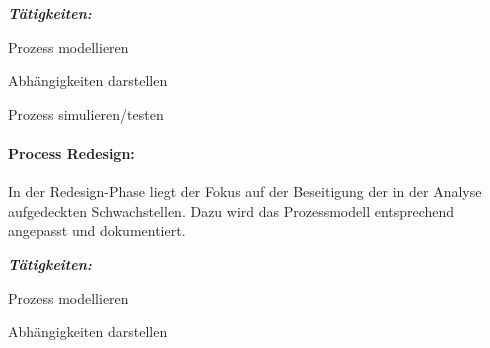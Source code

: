 \medskip\textit{\textbf{Tätigkeiten:}}
\begin{compactitem}{}
\item[] Prozess modellieren
\item[] Abhängigkeiten darstellen
\item[] Prozess simulieren/testen
\end{compactitem}

%
%
%

\newpage
\paragraph*{Process Redesign:}
In der Redesign-Phase liegt der Fokus auf der Beseitigung der in der Analyse aufgedeckten Schwachstellen. Dazu wird das Prozessmodell entsprechend angepasst und dokumentiert. 

\medskip\textit{\textbf{Tätigkeiten:}}
\begin{compactitem}{}
\item[] Prozess modellieren
\item[] Abhängigkeiten darstellen
\end{compactitem}

%
%




